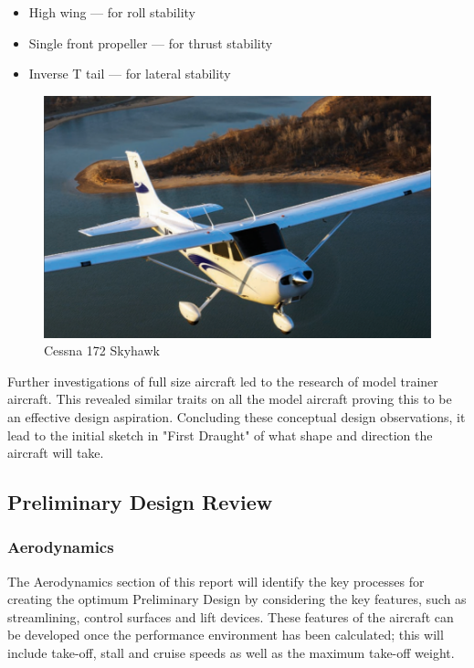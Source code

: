\documentclass[12pt]{article}
\begin{document}
\begin{itemize}
\item{High wing --- for roll stability}
\item{Single front propeller --- for thrust stability}
\item{Inverse T tail --- for lateral stability}
\end{itemize}

\begin{figure}[h]
\includegraphics[width=\columnwidth]{cessna.jpg}
\centering
\caption{Cessna 172 Skyhawk}
\label{fig:cessna}
\end{figure}

\noindent Further investigations of full size aircraft led to the research of model trainer aircraft. \cite{TRAINERREF} This revealed similar traits on all the model aircraft proving this to be an effective design aspiration. Concluding these conceptual design observations, it lead to the initial sketch in "First Draught" of what shape and direction the aircraft will take. \\

\subsection{Preliminary Design Review}

\subsubsection{Aerodynamics}

\noindent The Aerodynamics section of this report will identify the key processes for creating the optimum Preliminary Design by considering the key features, such as streamlining, control surfaces and lift devices. These features of the aircraft can be developed once the performance environment has been calculated; this will include take-off, stall and cruise speeds as well as the maximum take-off weight. \\
\end{document}

